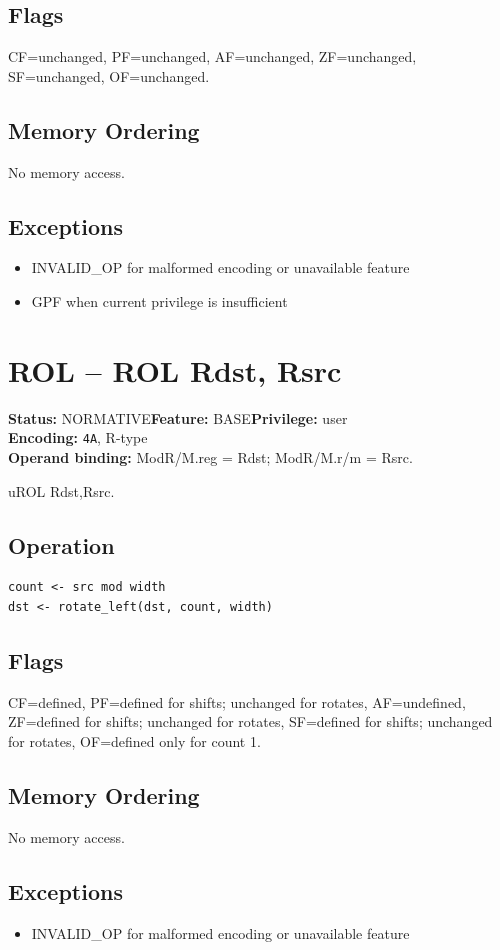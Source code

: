 \documentclass[10pt]{article}
\begin{document}
\subsection*{Flags}
CF=unchanged, PF=unchanged, AF=unchanged, ZF=unchanged, SF=unchanged, OF=unchanged.
\subsection*{Memory Ordering}
No memory access.
\subsection*{Exceptions}
\begin{itemize}
\item INVALID\_OP for malformed encoding or unavailable feature
\item GPF when current privilege is insufficient
\end{itemize}
\clearpage

\section{ROL -- ROL Rdst, Rsrc}
\textbf{Status:} NORMATIVE\quad \textbf{Feature:} BASE\quad \textbf{Privilege:} user\\
\textbf{Encoding:} \texttt{4A}, R-type\\
\textbf{Operand binding:} ModR/M.reg = Rdst; ModR/M.r/m = Rsrc.

uROL Rdst,Rsrc.

\subsection*{Operation}
\begin{lstlisting}
count <- src mod width
dst <- rotate_left(dst, count, width)
\end{lstlisting}
\subsection*{Flags}
CF=defined, PF=defined for shifts; unchanged for rotates, AF=undefined, ZF=defined for shifts; unchanged for rotates, SF=defined for shifts; unchanged for rotates, OF=defined only for count 1.
\subsection*{Memory Ordering}
No memory access.
\subsection*{Exceptions}
\begin{itemize}
\item INVALID\_OP for malformed encoding or unavailable feature
\end{itemize}
\clearpage
\end{document}
